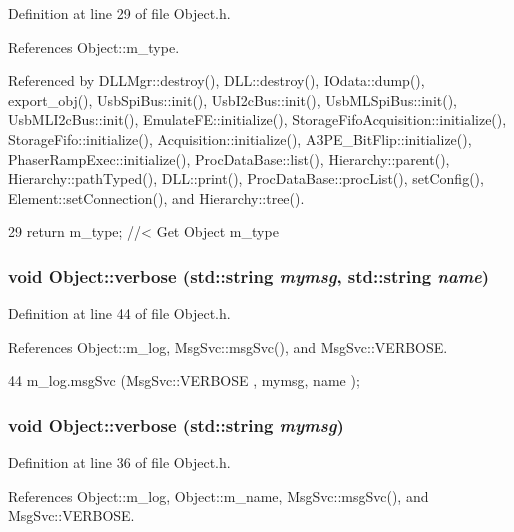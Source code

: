 Definition at line 29 of file Object.h.

References Object::m\_\-type.

Referenced by DLLMgr::destroy(), DLL::destroy(), IOdata::dump(), export\_\-obj(), UsbSpiBus::init(), UsbI2cBus::init(), UsbMLSpiBus::init(), UsbMLI2cBus::init(), EmulateFE::initialize(), StorageFifoAcquisition::initialize(), StorageFifo::initialize(), Acquisition::initialize(), A3PE\_\-BitFlip::initialize(), PhaserRampExec::initialize(), ProcDataBase::list(), Hierarchy::parent(), Hierarchy::pathTyped(), DLL::print(), ProcDataBase::procList(), setConfig(), Element::setConnection(), and Hierarchy::tree().


\begin{DoxyCode}
29 { return m_type;       } //< Get Object m_type
\end{DoxyCode}
\hypertarget{classObject_a2d4120195317e2a3c6532e8bb9f3da68}{
\subsubsection[{verbose}]{\setlength{\rightskip}{0pt plus 5cm}void Object::verbose (std::string {\em mymsg}, \/  std::string {\em name})}}
\label{classObject_a2d4120195317e2a3c6532e8bb9f3da68}


Definition at line 44 of file Object.h.

References Object::m\_\-log, MsgSvc::msgSvc(), and MsgSvc::VERBOSE.


\begin{DoxyCode}
44 { m_log.msgSvc (MsgSvc::VERBOSE , mymsg, name ); }
\end{DoxyCode}
\hypertarget{classObject_a83d2db2df682907ea1115ad721c1c4a1}{
\subsubsection[{verbose}]{\setlength{\rightskip}{0pt plus 5cm}void Object::verbose (std::string {\em mymsg})}}
\label{classObject_a83d2db2df682907ea1115ad721c1c4a1}


Definition at line 36 of file Object.h.

References Object::m\_\-log, Object::m\_\-name, MsgSvc::msgSvc(), and MsgSvc::VERBOSE.

